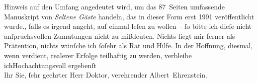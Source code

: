 \begin{ledgroupsized}[t]{13cm}
{{{                        Hinweis auf den Umfang angedeutet wird, um das 87 Seiten umfassende
                        Manuskript von \emph{Seltene Gäste} handeln, das
                        in dieser Form erst 1991 veröffentlicht wurde.}}}\label{K_L01792_2h}, falls es
                    irgend angeht, auf einmal leſen zu wollen – ſo bitte ich dieſe nicht
                    anſpruchsvollen Zumutungen nicht zu mißdeuten. Nichts liegt mir ferner als
                    Prätention, nichts wünſche ich ſoſehr als Rat und Hilfe. In der Hoffnung,
                    diesmal, wenn verdient, realerer Erfolge teilhaftig zu werden, verbleibe
                        ich\hspace*{1.5em}Hochachtungsvoll ergebenſt{\\}Ihr Sie,
                    ſehr geehrter Herr Doktor, verehrender\pend
           \pstart \spacefill\mbox{Albert Ehrenstein.}\pend{}          \endnumbering{}\end{ledgroupsized}  \newcommand{\dateiname}{L01792}\newcommand{\titel}{Albert Ehrenstein an Arthur Schnitzler, 10. 10. 1908}\newcommand{\editorInnen}{Martin Anton Müller und Gerd-Hermann Susen}
            \footnotesize
\begin{ledgroupsized}[t]{11.5cm}
\end{ledgroupsized}
         
      